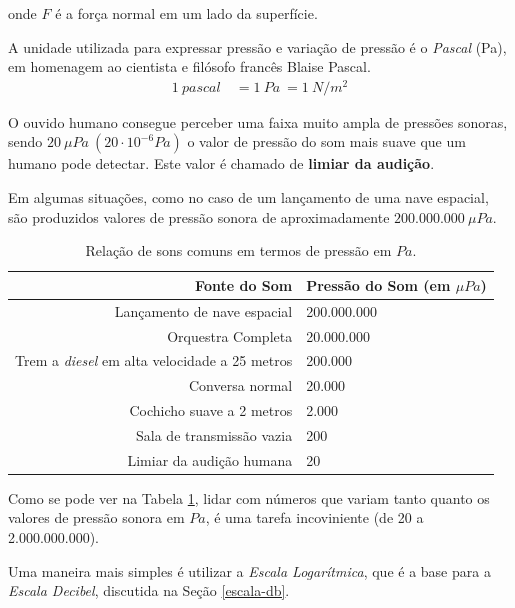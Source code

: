 \documentclass[
    12pt,               %
    openright,          %
    oneside,
    a4paper,            
    english,            %
    brazil              %
    ]{abntex2}
\begin{document}
onde $F$ é a força normal em um lado da superfície. 

A unidade utilizada para expressar pressão e variação de pressão é o \textit{Pascal} (Pa), em homenagem ao cientista e filósofo francês Blaise Pascal.
\begin{align}
   1 \ pascal \ & = 1 \ Pa \ = 1 \ N/m^2
\end{align}

O ouvido humano consegue perceber uma faixa muito ampla de pressões sonoras, sendo $20 \ \mu Pa \ (20 \cdot 10^{-6} Pa)$ o valor de pressão do som mais suave que um humano pode detectar. Este valor é chamado de \textbf{limiar da audição}. 

Em algumas situações, como no caso de um lançamento de uma nave espacial, são produzidos valores de pressão sonora de aproximadamente $200.000.000 \ \mu Pa $.%

\begin{table}[!htb]
    \caption{Relação de sons comuns em termos de pressão em $Pa$. }
    \label{tabela-pa}
    \center
    \begin{tabular}{|r|l|}
    \hline
      \rowcolor[gray]{.9}
      \textbf{Fonte do Som} & \textbf{Pressão do Som (em $\mu Pa$)}\\
      \hline
      \textsf{Lançamento de nave espacial} & \textsf{200.000.000}\\
      \hline
      \textsf{Orquestra Completa} & \textsf{20.000.000}\\
      \hline
      \textsf{Trem a \textit{diesel} em alta velocidade a 25 metros} & \textsf{200.000}\\
      \hline
      \textsf{Conversa normal} & \textsf{20.000}\\
      \hline
      \textsf{Cochicho suave a 2 metros} & \textsf{2.000}\\
      \hline
      \textsf{Sala de transmissão vazia} & \textsf{200}\\
      \hline
      \textsf{Limiar da audição humana} & \textsf{20}\\
      \hline
    \end{tabular}
  \end{table}

Como se pode ver na Tabela \ref{tabela-pa}, lidar com números que variam tanto quanto os valores de pressão sonora em $Pa$, é uma tarefa incoviniente (de 20 a 2.000.000.000). 

Uma maneira mais simples é utilizar a \textit{Escala Logarítmica}, que é a base para a \textit{Escala Decibel}, discutida na Seção \ref{escala-db}.
\end{document}
